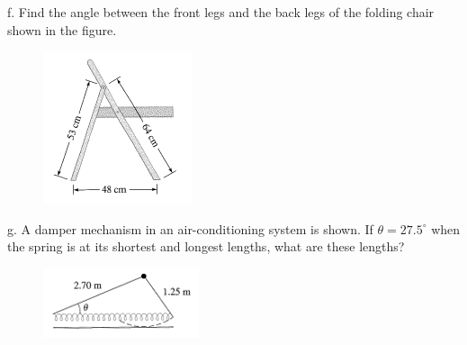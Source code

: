\documentclass[11pt]{article}
\begin{document}
f. Find the angle between the front legs and the back legs of the
folding chair shown in the figure.

\begin{figure}[h]
   \includegraphics[scale=.5]{./tri-02.png}
\end{figure}

g. A damper mechanism in an air-conditioning system is shown. If
$\theta=27.5^{\circ}$ when the spring is at its shortest and
longest lengths, what are these lengths?

\begin{figure}[h]
   \includegraphics[scale=.5]{./tri-10.png}
\end{figure}
\end{document}
